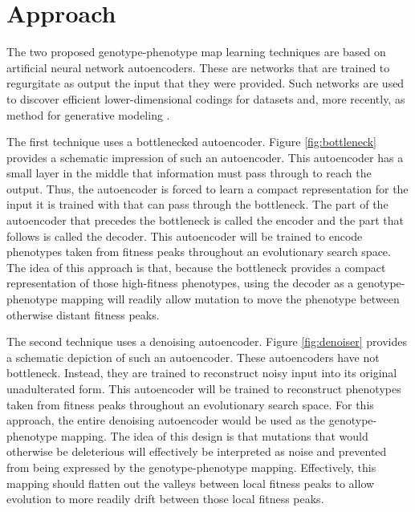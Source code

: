 \section{Approach} \label{sec:approach}

The two proposed genotype-phenotype map learning techniques are based on artificial neural network autoencoders.
These are networks that are trained to regurgitate as output the input that they were provided.
Such networks are used to discover efficient lower-dimensional codings for datasets and, more recently, as method for generative modeling \cite{liou2014autoencoder, kingma2013auto}.



The first technique uses a bottlenecked autoencoder.
Figure \ref{fig:bottleneck} provides a schematic impression of such an autoencoder.
This autoencoder has a small layer in the middle that information must pass through to reach the output.
Thus, the autoencoder is forced to learn a compact representation for the input it is trained with that can pass through the bottleneck.
The part of the autoencoder that precedes the bottleneck is called the encoder and the part that follows is called the decoder.
This autoencoder will be trained to encode phenotypes taken from fitness peaks throughout an evolutionary search space.
The idea of this approach is that, because the bottleneck provides a compact representation of those high-fitness phenotypes, using the decoder as a genotype-phenotype mapping will readily allow mutation to move the phenotype between otherwise distant fitness peaks.



The second technique uses a denoising autoencoder.
Figure \ref{fig:denoiser} provides a schematic depiction of such an autoencoder.
These autoencoders have not bottleneck.
Instead, they are trained to reconstruct noisy input into its original unadulterated form.
This autoencoder will be trained to reconstruct phenotypes taken from fitness peaks throughout an evolutionary search space.
For this approach, the entire denoising autoencoder would be used as the genotype-phenotype mapping.
The idea of this design is that mutations that would otherwise be deleterious will effectively be interpreted as noise and prevented from being expressed by the genotype-phenotype mapping.
Effectively, this mapping should flatten out the valleys between local fitness peaks to allow evolution to more readily drift between those local fitness peaks.
